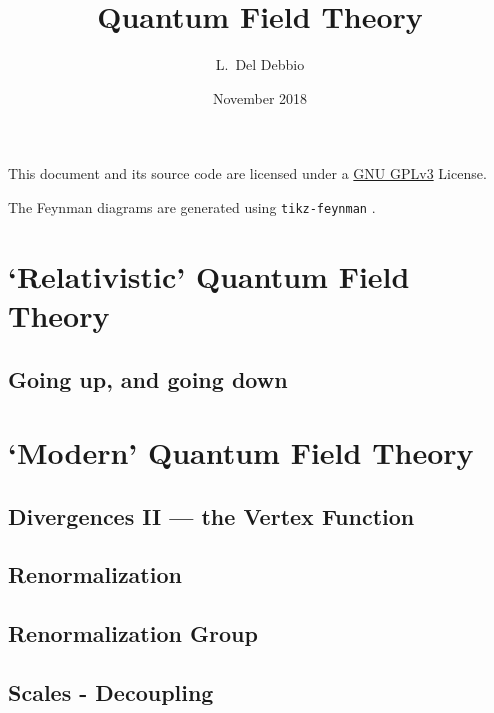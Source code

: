 \documentclass[bibliography=totoc]{notes}
\title{Quantum Field Theory}
\author{L.~Del Debbio}
\date{November 2018}
\begin{document}
%
\maketitle
\clearpage
\tableofcontents

\vspace{\fill}

This document and its source code are licensed under a \href{https://www.gnu.org/licenses/gpl-3.0.en.html}{GNU GPLv3} License.

The Feynman diagrams are generated using \texttt{tikz-feynman} \parencite{ELLIS2017103}.

\nocite{*}
\printbibliography[keyword=recommended,title={Recommended Textbooks},omitnumbers=true]



\part{`Relativistic' Quantum Field Theory}
\label{part:RQFT}


\chapter{Going up, and going down}
\part{`Modern' Quantum Field Theory}
\label{part:MQFT}



%






\chapter{Divergences II --- the Vertex Function}
\label{cha:diverg-ii-vert}


\chapter{Renormalization}
\label{cha:renormalization}
% 


\chapter{Renormalization Group}
\label{cha:renorm-group}

\chapter{Scales - Decoupling}
\label{cha:scales-decoupling}

\printindex
\printbibliography[notkeyword=recommended]
\end{document}
